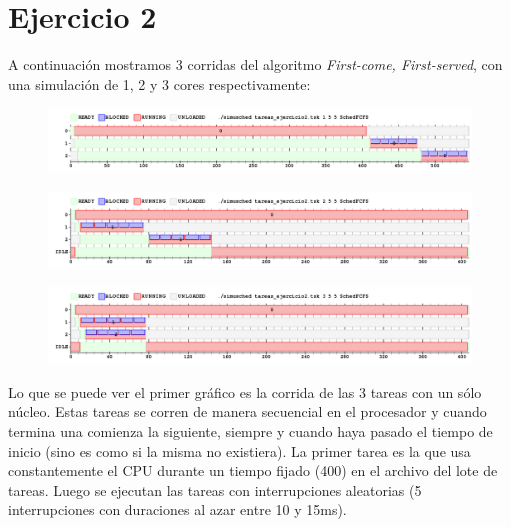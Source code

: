 \section{Ejercicio 2}

A continuación mostramos 3 corridas del algoritmo \textit{First-come, First-served}, con  una simulación de 1, 2 y 3 cores respectivamente:

\begin{figure}[h]
	\centering                                                       
	\includegraphics[width=450pt]{./figs/ejercicio2_1core.png}
\end{figure}

\begin{figure}[h]
	\centering                                                       
	\includegraphics[width=450pt]{./figs/ejercicio2_2cores.png}
\end{figure}

\begin{figure}[h]
	\centering                                                       
	\includegraphics[width=450pt]{./figs/ejercicio2_3cores.png}
\end{figure}

Lo que se puede ver el primer gráfico es la corrida de las 3 tareas con un sólo núcleo. Estas tareas se corren de manera secuencial en el procesador y cuando termina una comienza la siguiente, siempre y cuando haya pasado el tiempo de inicio (sino es como si la misma no existiera). La primer tarea es la que usa constantemente el CPU durante un tiempo fijado (400) en el archivo del lote de tareas. Luego se ejecutan las tareas con interrupciones aleatorias (5 interrupciones con duraciones al azar entre 10 y 15ms).

